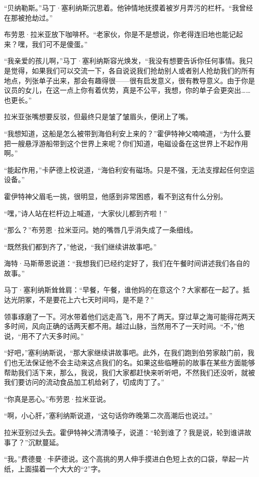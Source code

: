 \documentclass[AutoFakeBold=true]{book}
\begin{document}
``贝纳勒斯。''马丁·塞利纳斯沉思着。他钟情地抚摸着被岁月弄污的栏杆。``我曾经在那被抢劫过。''

布劳恩·拉米亚放下咖啡杯。``老家伙，你是不是想说，你老得连旧地也能记起来？嘿，我们可不是傻蛋。''

``我亲爱的孩儿啊，''马丁·塞利纳斯容光焕发，``我没有想要告诉你任何事情。我只是觉得，如果我们可以交流一下，各自说说我们抢劫别人或者别人抢劫我们的所有地点，列张单子出来，那会有趣得很——很有启发意义，很有教导意义。由于你是议员的女儿，在这一点上你有着优势，真是不公平，我想，你的单子会更突出……也更长。''

拉米亚张嘴想要反驳，但最终只是皱了皱眉头，便闭上了嘴。

``我想知道，这船是怎么被带到海伯利安上来的？''霍伊特神父喃喃道，``为什么要把一艘悬浮游船带到这个世界上来呢？你们知道，电磁设备在这世界上不起作用啊。''

``能起作用，''卡萨德上校说道，``海伯利安有磁场。只是不强，无法支撑起任何空运设备。''

霍伊特神父眉毛一挑，很明显，他感到非常困惑，看不到这有什么分别。

``嘿，''诗人站在栏杆边上喊道，``大家伙儿都到齐啦！''

``那么？''布劳恩·拉米亚问。她的嘴唇几乎消失成了一条细线。

``既然我们都到齐了，''他说，``我们继续讲故事吧。''

海特·马斯蒂恩说道：``我想我们已经约定好了，我们在午餐时间讲述我们各自的故事。''

马丁·塞利纳斯耸耸肩：``早餐，午餐，谁他妈的在意这个？大家都在一起了。抵达光阴冢，不是要花上六七天时间吗，是不是？''

领事琢磨了一下。河水带着他们远走高飞，用不了两天。穿过草之海可能得花两天多时间，风向正确的话两天都不用。越过山脉，当然用不了一天时间。``不，''他说，``用不了六天多时间。''

``好吧，''塞利纳斯说，``那大家继续讲故事吧。此外，在我们跑到伯劳家敲门前，我们也无法保证他不会主动来这点我们的名。如果这些临睡前的故事在某些方面能够帮助我们活下来，那么，我说，我们大家都赶快来听听吧，不然我们还没听，就被我们要访问的流动食品加工机给剁了，切成肉丁了。''

``你真是恶心。''布劳恩·拉米亚说。

``啊，小心肝，''塞利纳斯说道，``这句话你昨晚第二次高潮后也说过。''

拉米亚别过头去。霍伊特神父清清嗓子，说道：``轮到谁了？我是说，轮到谁讲故事了？''沉默蔓延。

``我。''费德曼·卡萨德说。这个高挑的男人伸手摸进白色短上衣的口袋，举起一片纸，上面描着一个大大的``2''字。
\end{document}

